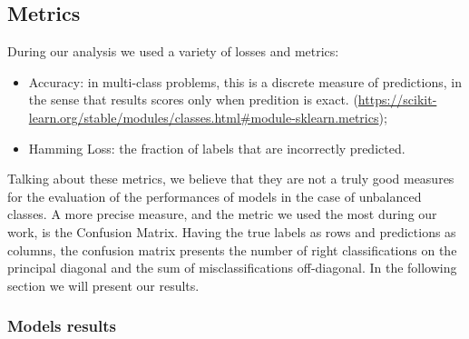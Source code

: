 \documentclass[12pt]{article}
\begin{document}
\newpage
\subsection{Metrics}
During our analysis we used a variety of losses and metrics:

\begin{itemize}
\item Accuracy: in multi-class problems, this is a discrete measure of predictions, in the sense that results scores only when predition is exact.
(\url{https://scikit-learn.org/stable/modules/classes.html#module-sklearn.metrics});
\item Hamming Loss: the fraction of labels that are incorrectly predicted.
\end{itemize}

Talking about these metrics, we believe that they are not a truly good measures for the evaluation of the performances of models in the case of unbalanced classes. A more precise measure, and the metric we used the most during our work, is the Confusion Matrix. Having the true labels as rows and predictions as columns, the confusion matrix presents the number of right classifications on the principal diagonal and the sum of misclassifications off-diagonal. In the following section we will present our results.

\subsubsection{Models results}
\end{document}
